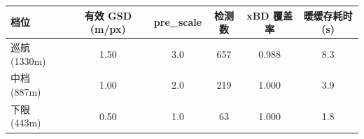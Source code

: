 \begin{tabular}{lccccc}
\hline
档位 & 有效 GSD (m/px) & pre\_scale & 检测数 & xBD 覆盖率 & 暖缓存耗时 (s) \\
\hline
巡航 (1330m) & 1.50 & 3.0 & 657 & 0.988 & 8.3 \\
中档 (887m) & 1.00 & 2.0 & 219 & 1.000 & 3.9 \\
下限 (443m) & 0.50 & 1.0 & 63 & 1.000 & 1.8 \\
\hline
\end{tabular}
